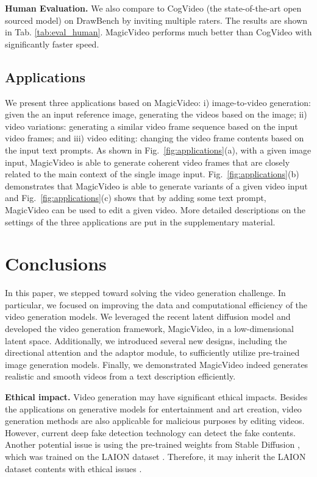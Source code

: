 \documentclass[10pt,twocolumn,letterpaper]{article}
\newcommand{\myPara}[1]{\vspace{6pt}\noindent\textbf{#1}}
\begin{document}
\myPara{Human Evaluation.} We also compare to CogVideo (the state-of-the-art open sourced model) on  DrawBench \cite{imagen} by inviting multiple raters. The results are shown in Tab. \ref{tab:eval_human}.   MagicVideo performs much better than CogVideo \cite{CogVideo} with significantly faster speed.








 


\subsection{Applications}
We   present three applications based on MagicVideo: i) image-to-video generation: given the an input reference image, generating the videos based on the image;  ii) video variations: generating a  similar video frame sequence based on the input video frames;  and iii) video editing: changing the video frame contents based on the input text prompts. As shown in Fig.~\ref{fig:applications}(a), with a given image input, MagicVideo is able to generate coherent video frames that are closely related to the main context of the single image input. Fig.~\ref{fig:applications}(b) demonstrates that MagicVideo is able to generate variants of a given video input and Fig.~\ref{fig:applications}(c) shows that by adding some text prompt, MagicVideo can be used to edit a given video. More detailed descriptions on the settings of the three applications are put in the supplementary material.

 

\section{Conclusions}
In this paper, we stepped toward solving the video generation challenge. In particular, we focused on improving the data and computational efficiency of the video generation models. We leveraged the recent latent diffusion model and developed the video generation framework, MagicVideo, in a low-dimensional latent space. Additionally, we introduced several new designs, including the directional attention and the adaptor module, to sufficiently utilize pre-trained image generation models. Finally, we demonstrated MagicVideo indeed generates realistic and smooth videos from a text  description efficiently. 

\myPara{Ethical impact.} Video generation may have significant ethical impacts. Besides the applications on   generative models  for entertainment and art creation, video generation methods are also applicable for malicious purposes by editing videos. However, current deep fake detection technology can detect the fake contents. Another potential issue is using the pre-trained weights from Stable Diffusion \cite{rombach2022high},
which was trained on the LAION dataset \cite{laion5b}. Therefore, it may inherit the LAION dataset   contents with ethical issues  \cite{birhane2021multimodal}.



{

}
\end{document}
